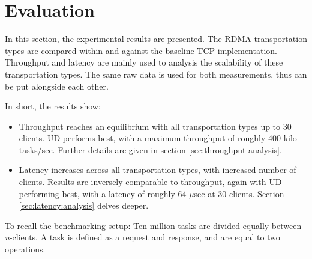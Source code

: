 
\chapter{Evaluation}\label{ch:evaluation} %



\ifpdf
    \graphicspath{{figures/PNG}}
\else
    \graphicspath{{7/figures/EPS/}{7/figures/}}
\fi


% 
In this section, the experimental results are presented.
The RDMA transportation types are compared within and against the baseline TCP implementation.
Throughput and latency are mainly used to analysis the scalability of these transportation types.
The same raw data is used for both measurements, thus can be put alongside each other.

In short, the results show:
\begin{itemize}
    \item Throughput reaches an equilibrium with all transportation types up to 30 clients.
    UD performs best, with a maximum throughput of roughly 400 kilo-tasks/sec.
    Further details are given in section \ref{sec:throughput-analysis}.
    \item Latency increases across all transportation types, with increased number of clients.
    Results are inversely comparable to throughput, again with UD performing best, with a latency of roughly 64 $\mu$sec at 30 clients.
    Section \ref{sec:latency:analysis} delves deeper.
\end{itemize}

To recall the benchmarking setup:
Ten million tasks are divided equally between \textit{n}-clients.
A task is defined as a request and response, and are equal to two operations.

